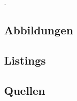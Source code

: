 \documentclass[12pt]{article}
\begin{document}
{\small\color{white}.}
\vspace{-2cm}
\subsection*{Abbildungen}
\label{subsec:abbildungen}
\begingroup
\renewcommand{\section}[2]{}
\listoffigures
\endgroup
\newpage

\subsection*{Listings}
\label{subsec:listings}
\begingroup
\renewcommand{\section}[2]{}
\lstlistoflistings
\endgroup
\newpage

\subsection*{Quellen}
\label{subsec:quellen}
\begingroup
\renewcommand{\section}[2]{}


\endgroup
\newpage
\end{document}
